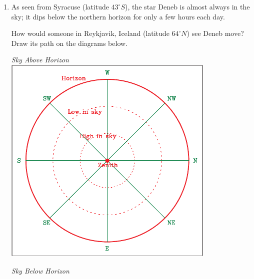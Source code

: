 \documentclass[12pt]{article}
\begin{document}
\begin{enumerate}
\begin{center}
\begin{minipage}{0.4\textwidth}
\begin{center}
				\end{center}
			\end{minipage}
		\end{center}
		
		
		\vspace{1.5in}
		
		\item As seen from Syracuse (latitude $43^\circ S$), the star Deneb is almost always in the sky; it dips below the northern horizon for only a few hours each day.
		
		How would someone in Reykjavik, Iceland (latitude $64^\circ N$) see Deneb move? Draw its path on the diagrams below. 
		
						\begin{center}
			\begin{minipage}{0.4\textwidth}
				\begin{center}
					\it Sky Above Horizon\\
					\includegraphics[width=0.8\textwidth]{topsky-crop.pdf}
				\end{center}
			\end{minipage}
			\begin{minipage}{0.4\textwidth}
				\begin{center}
					\it Sky Below Horizon\\

\end{center}
\end{minipage}
\end{center}
\end{enumerate}
\end{document}
